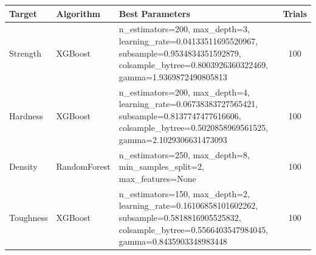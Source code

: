 \begin{tabular}{lp{2cm}p{10cm}c}
\toprule
Target & Algorithm & Best Parameters & Trials \\
\midrule
Strength & XGBoost & n_estimators=200, max_depth=3, learning_rate=0.04133511695520967, subsample=0.9534834351592879, colsample_bytree=0.8003926360322469, gamma=1.9369872490805813 & 100 \\
Hardness & XGBoost & n_estimators=200, max_depth=4, learning_rate=0.06738383727565421, subsample=0.8137747477616606, colsample_bytree=0.5020858969561525, gamma=2.1029306631473093 & 100 \\
Density & RandomForest & n_estimators=250, max_depth=8, min_samples_split=2, max_features=None & 100 \\
Toughness & XGBoost & n_estimators=150, max_depth=2, learning_rate=0.16106858101602262, subsample=0.5818816905525832, colsample_bytree=0.5566403547984045, gamma=0.8435903348983448 & 100 \\
\bottomrule
\end{tabular}
